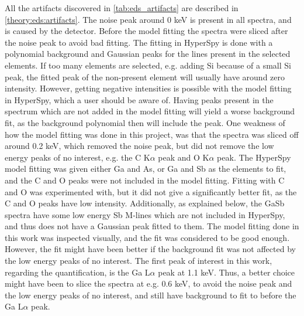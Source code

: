 All the artifacts discovered in \cref{tab:eds_artifacts} are described in \cref{theory:eds:artifacts}.
The noise peak around 0 keV is present in all spectra, and is caused by the detector.
Before the model fitting the spectra were sliced after the noise peak to avoid bad fitting.
The fitting in HyperSpy is done with a polynomial background and Gaussian peaks for the lines present in the selected elements.
If too many elements are selected, e.g. adding Si because of a small Si peak, the fitted peak of the non-present element will usually have around zero intensity.
However, getting negative intensities is possible with the model fitting in HyperSpy, which a user should be aware of.
Having peaks present in the spectrum which are not added in the model fitting will yield a worse background fit, as the background polynomial then will include the peak.
One weakness of how the model fitting was done in this project, was that the spectra was sliced off around 0.2 keV, which removed the noise peak, but did not remove the low energy peaks of no interest, e.g. the C K$\alpha$ peak and O K$\alpha$ peak.
The HyperSpy model fitting was given either Ga and As, or Ga and Sb as the elements to fit, and the C and O peaks were not included in the model fitting.
Fitting with C and O was experimented with, but it did not give a significantly better fit, as the C and O peaks have low intensity.
Additionally, as explained below, the GaSb spectra have some low energy Sb M-lines which are not included in HyperSpy, and thus does not have a Gaussian peak fitted to them.
The model fitting done in this work was inspected visually, and the fit was considered to be good enough.
However, the fit might have been better if the background fit was not affected by the low energy peaks of no interest.
The first peak of interest in this work, regarding the quantification, is the Ga L$\alpha$ peak at 1.1 keV.
Thus, a better choice might have been to slice the spectra at e.g. 0.6 keV, to avoid the noise peak and the low energy peaks of no interest, and still have background to fit to before the Ga L$\alpha$ peak.


